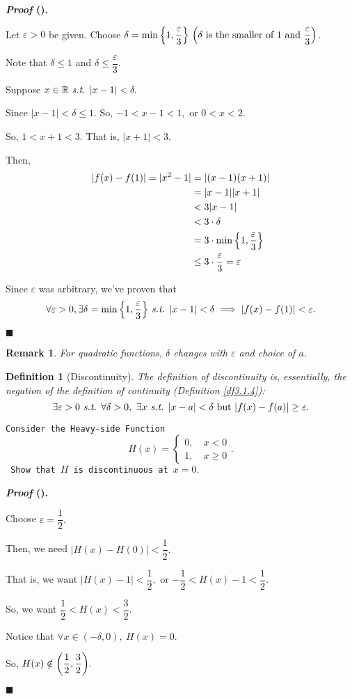 \documentclass[12pt,a4paper]{article}
\newtheorem{df}{Definition}[subsection]
\newcounter{nprf}[subsection]
\newtheorem*{rmk}{\indent Remark}
\newenvironment*{prf}{\par\indent\textbf{\textit{Proof} (\stepcounter{nprf}\thenprf). }\par }{\par\hfill $\blacksquare$\par}
\def\R{{\mathbb{R}}}
\def\epsilon{\varepsilon}
\def\st{\emph{ s.t. }}
\begin{document}
\begin{framed}
\begin{prf}
	Let $\epsilon>0$ be given. Choose $\delta=\min\qty{1,\dfrac{\epsilon}{3}}\ \qty(\delta\text{ is the smaller of }1\text{ and }\dfrac{\epsilon}{3})$.\par Note that $\delta\leq1$ and $\delta\leq\dfrac{\epsilon}{3}.$\par Suppose $x\in\R\st|x-1|<\delta.$\par Since $|x-1|<\delta\leq1.$ So, $-1<x-1<1,$ or $0<x<2.$\par So, $1<x+1<3.$ That is, $|x+1|<3.$\par Then, \[\begin{aligned}|f(x)-f(1)|=|x^2-1|&=|(x-1)(x+1)|\\&=|x-1||x+1|\\&<3|x-1|\\&<3\cdot\delta\\&=3\cdot\min\qty{1,\dfrac{\epsilon}{3}}\\&\leq3\cdot\dfrac{\epsilon}{3}=\epsilon\end{aligned}\]\par Since $\epsilon$ was arbitrary, we've proven that \[\forall\epsilon>0,\exists\delta=\min\qty{1,\dfrac{\epsilon}{3}}\st|x-1|<\delta\implies|f(x)-f(1)|<\epsilon.\]
\end{prf}
\begin{rmk}
	For quadratic functions, $\delta$ changes with $\epsilon$ and choice of $a$.	
\end{rmk}
\end{framed}
\begin{df}[Discontinuity]
	The definition of discontinuity is, essentially, the negation of the definition of continuity (Definition \ref{df3.1.4}): \[\exists\epsilon>0\st\forall\delta>0,\ \exists x\st|x-a|<\delta\text{ but }|f(x)-f(a)|\geq\epsilon.\]	
\end{df}
\begin{framed}
\noindent\texttt{Consider the Heavy-side Function \[H(x)=\begin{cases}0,\quad x<0\\1,\quad x\geq0\end{cases}.\] Show that $H$ is discontinuous at $x=0.$}
\begin{prf}
	Choose $\epsilon=\dfrac{1}{2}.$\par Then, we need $|H(x)-H(0)|<\dfrac{1}{2}.$\par That is, we want $|H(x)-1|<\dfrac{1}{2},$ or $-\dfrac{1}{2}<H(x)-1<\dfrac{1}{2}.$\par So, we want $\dfrac{1}{2}<H(x)<\dfrac{3}{2}.$\par Notice that $\forall x\in(-\delta,0),\ H(x)=0$.\par So, $H(x)\notin\qty(\dfrac{1}{2},\dfrac{3}{2}).$
\end{prf}
\end{framed}
\end{document}
